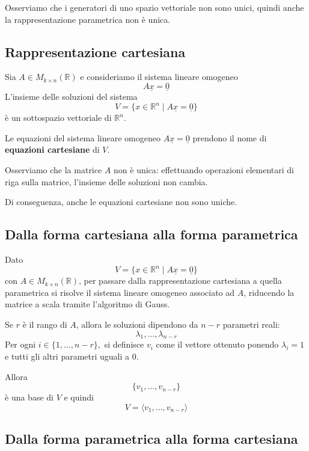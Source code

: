 \documentclass[
  a4paper,
]{article}
\begin{document}
Osserviamo che i generatori di uno spazio vettoriale non sono unici,
quindi anche la rappresentazione parametrica non è unica.

\hypertarget{rappresentazione-cartesiana}{%
\subsection{Rappresentazione
cartesiana}\label{rappresentazione-cartesiana}}

\begin{definitionbox}
Sia \(A\in M_{k\times n}(\mathbb{R})\) e consideriamo il sistema lineare
omogeneo \[
A\underline{x}=\underline{0}
\] L'insieme delle soluzioni del sistema \[
V=\{x\in\mathbb{R}^n \mid A\underline{x}=\underline{0}\}
\] è un sottospazio vettoriale di \(\mathbb{R}^n\).

Le equazioni del sistema lineare omogeneo
\(A\underline{x}=\underline{0}\) prendono il nome di \textbf{equazioni
cartesiane} di \(V\).
\end{definitionbox}

Osserviamo che la matrice \(A\) non è unica: effettuando operazioni
elementari di riga sulla matrice, l'insieme delle soluzioni non cambia.

Di conseguenza, anche le equazioni cartesiane non sono uniche.

\hypertarget{dalla-forma-cartesiana-alla-forma-parametrica}{%
\subsection{Dalla forma cartesiana alla forma
parametrica}\label{dalla-forma-cartesiana-alla-forma-parametrica}}

Dato \[
V=\{x\in\mathbb{R}^n \mid A\underline{x}=\underline{0}\}
\] con \(A\in M_{k\times n}(\mathbb{R})\), per passare dalla
rappresentazione cartesiana a quella parametrica si risolve il sistema
lineare omogeneo associato ad \(A\), riducendo la matrice a scala
tramite l'algoritmo di Gauss.

Se \(r\) è il rango di \(A\), allora le soluzioni dipendono da \(n- r\)
parametri reali: \[
\lambda_1,\dots,\lambda_{n-r}
\] Per ogni \(i\in\{1,\dots,n-r\},\) si definisce \(v_i\) come il
vettore ottenuto ponendo \(\lambda_i=1\) e tutti gli altri parametri
uguali a \(0\).

Allora \[
\{v_1,\dots,v_{n-r}\}
\] è una base di \(V\) e quindi \[
V=\langle v_1,\dots,v_{n-r}\rangle
\]

\hypertarget{dalla-forma-parametrica-alla-forma-cartesiana}{%
\subsection{Dalla forma parametrica alla forma
cartesiana}\label{dalla-forma-parametrica-alla-forma-cartesiana}}
\end{document}
